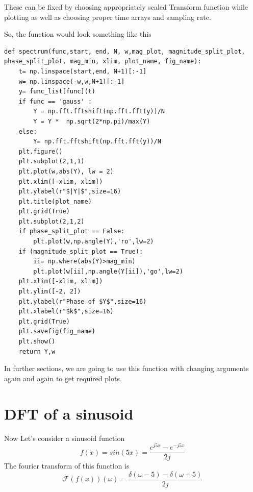 \documentclass[12pt, a4paper]{report}
\begin{document}
These can be fixed by choosing appropriately scaled Transform function while plotting as well as choosing proper time arrays and sampling rate.

So, the function would look something like this
\begin{Verbatim}
def spectrum(func,start, end, N, w,mag_plot, magnitude_split_plot, 
phase_split_plot, mag_min, xlim, plot_name, fig_name):
    t= np.linspace(start,end, N+1)[:-1]
    w= np.linspace(-w,w,N+1)[:-1]
    y= func_list[func](t)
    if func == 'gauss' :
        Y = np.fft.fftshift(np.fft.fft(y))/N
        Y = Y *  np.sqrt(2*np.pi)/max(Y) 
    else:
        Y= np.fft.fftshift(np.fft.fft(y))/N
    plt.figure()
    plt.subplot(2,1,1)
    plt.plot(w,abs(Y), lw = 2)
    plt.xlim([-xlim, xlim])
    plt.ylabel(r"$|Y|$",size=16)
    plt.title(plot_name)
    plt.grid(True)
    plt.subplot(2,1,2)
    if phase_split_plot == False:
        plt.plot(w,np.angle(Y),'ro',lw=2)
    if (magnitude_split_plot == True):
        ii= np.where(abs(Y)>mag_min)
        plt.plot(w[ii],np.angle(Y[ii]),'go',lw=2)
    plt.xlim([-xlim, xlim])
    plt.ylim([-2, 2])
    plt.ylabel(r"Phase of $Y$",size=16)
    plt.xlabel(r"$k$",size=16)
    plt.grid(True)
    plt.savefig(fig_name)
    plt.show()
    return Y,w

\end{Verbatim}

In further sections, we are going to use this function with changing arguments again and again to get required plots.
\section*{DFT of a sinusoid}

Now Let's consider a sinusoid function
\begin{equation}
	f(x) = sin(5x) = \frac{e^{j5x} - e^{-j5x}}{2j}
\end{equation}
The fourier transform of this function is 
\begin{equation}
	\mathcal{F}(f(x))(\omega) = \frac{\delta(\omega-5) -  \delta(\omega+5)}{2j}
\end{equation}
\end{document}
